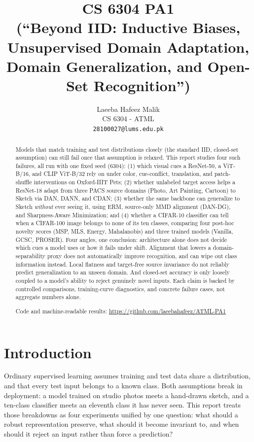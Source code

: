 \documentclass{article}
\title{CS 6304 PA1 \\ \large (``Beyond IID: Inductive Biases, Unsupervised Domain Adaptation, Domain Generalization, and Open-Set Recognition'')}
\author{%
  Laeeba Hafeez Malik \\
  CS 6304 - ATML\\
  \texttt{28100027@lums.edu.pk}
}
\begin{document}
\maketitle

\begin{abstract}
Models that match training and test distributions closely (the standard IID, closed-set
assumption) can still fail once that assumption is relaxed. This report studies four such
failures, all run with one fixed seed (6304): (1) which visual cues a ResNet-50, a ViT-B/16, and
CLIP ViT-B/32 rely on under color, cue-conflict, translation, and patch-shuffle interventions on
Oxford-IIIT Pets; (2) whether unlabeled target access helps a ResNet-18 adapt from three PACS
source domains (Photo, Art Painting, Cartoon) to Sketch via DAN, DANN, and CDAN; (3) whether the
same backbone can generalize to Sketch \emph{without} ever seeing it, using ERM, source-only MMD
alignment (DAN-DG), and Sharpness-Aware Minimization; and (4) whether a CIFAR-10 classifier can
tell when a CIFAR-100 image belongs to none of its ten classes, comparing four post-hoc novelty
scores (MSP, MLS, Energy, Mahalanobis) and three trained models (Vanilla, GCSC, PROSER). Four
angles, one conclusion: architecture alone does not decide which cues a model uses or how it fails
under shift. Alignment that lowers a domain-separability proxy does not automatically improve
recognition, and can wipe out class information instead. Local flatness and target-free source
invariance do not reliably predict generalization to an unseen domain. And closed-set accuracy is
only loosely coupled to a model's ability to reject genuinely novel inputs. Each claim is backed by
controlled comparisons, training-curve diagnostics, and concrete failure cases, not aggregate
numbers alone.

\medskip
\noindent Code and machine-readable results: \url{https://github.com/laeebahafeez/ATML-PA1}
\end{abstract}

\section{Introduction}

Ordinary supervised learning assumes training and test data share a distribution, and that every
test input belongs to a known class. Both assumptions break in deployment: a model trained on
studio photos meets a hand-drawn sketch, and a ten-class classifier meets an eleventh class it has
never seen. This report treats those breakdowns as four experiments unified by one question: what
should a robust representation preserve, what should it become invariant to, and when should it
reject an input rather than force a prediction?
\end{document}

